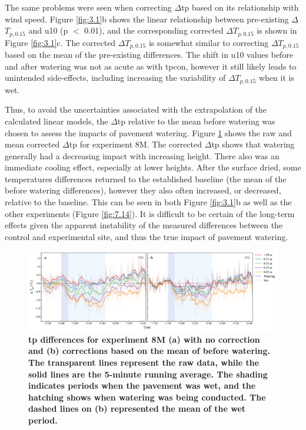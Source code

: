 \documentclass[final,3p,times,authoryear]{elsarticle}
\begin{document}
The same problems were seen when correcting $\Delta$\gls{tp} based on its relationship with wind speed. Figure \ref{fig:3.1}b shows the linear relationship between pre-existing $\Delta$$T_{p,0.15}$ and \gls{u10} (\gls{p} $<$ 0.01), and the corresponding corrected $\Delta$$T_{p,0.15}$ is shown in Figure \ref{fig:3.1}c. The corrected $\Delta$$T_{p,0.15}$ is somewhat similar to correcting $\Delta$$T_{p,0.15}$ based on the mean of the pre-existing differences. The shift in \gls{u10} values before and after watering was not as acute as with \gls{tpcon}, however it still likely leads to unintended side-effects, including increasing the variability of $\Delta$$T_{p,0.15}$ when it is wet.

Thus, to avoid the uncertainties associated with the extrapolation of the calculated linear
models, the $\Delta$\gls{tp} relative to the mean before watering was chosen to assess the impacts of pavement watering. Figure \ref{fig:3.2} shows the raw and mean corrected $\Delta$\gls{tp} for experiment 8M. The corrected $\Delta$\gls{tp} shows that watering generally had a decreasing impact with increasing height. There also was an immediate cooling effect, especially at lower heights. After the surface dried, some temperatures differences returned to the established baseline (the mean of the before watering differences), however they also often increased, or decreased, relative to the baseline. This can be seen in both Figure \ref{fig:3.1}b as well as the other experiments (Figure \ref{fig:7.14}). It is difficult to be certain of the long-term effects given the apparent instability of the measured differences between the control and experimental site, and thus the true impact of pavement watering.

\begin{figure}
\centering
\includegraphics[trim={0 0 0 0},clip,scale=1.1]{pict013.png}
\caption{\bf \gls{tp} differences for experiment 8M (a) with no correction and (b) corrections based on the mean of before watering. The transparent lines represent the raw data, while the solid lines are the 5-minute running average. The shading indicates periods when the pavement was wet, and the hatching shows when watering was being conducted. The dashed lines on (b) represented the mean of the wet period.}
 \label{fig:3.2}
\end{figure}
\end{document}
